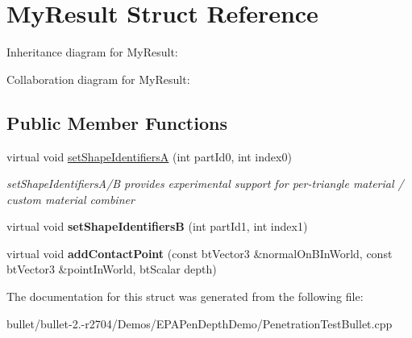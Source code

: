 \hypertarget{struct_my_result}{\section{My\+Result Struct Reference}
\label{struct_my_result}
}


Inheritance diagram for My\+Result\+:


Collaboration diagram for My\+Result\+:
\subsection*{Public Member Functions}
\begin{DoxyCompactItemize}
\item 
\hypertarget{struct_my_result_a2f12c46d079561c3f0c3015d3bc7e298}{virtual void \hyperlink{struct_my_result_a2f12c46d079561c3f0c3015d3bc7e298}{set\+Shape\+Identifiers\+A} (int part\+Id0, int index0)}\label{struct_my_result_a2f12c46d079561c3f0c3015d3bc7e298}

\begin{DoxyCompactList}\small\item\em set\+Shape\+Identifiers\+A/\+B provides experimental support for per-\/triangle material / custom material combiner \end{DoxyCompactList}\item 
\hypertarget{struct_my_result_a21dcb134b75557d26e438585c2888112}{virtual void {\bfseries set\+Shape\+Identifiers\+B} (int part\+Id1, int index1)}\label{struct_my_result_a21dcb134b75557d26e438585c2888112}

\item 
\hypertarget{struct_my_result_a642ea94371e02873b68f9f57f4ea1b33}{virtual void {\bfseries add\+Contact\+Point} (const bt\+Vector3 \&normal\+On\+B\+In\+World, const bt\+Vector3 \&point\+In\+World, bt\+Scalar depth)}\label{struct_my_result_a642ea94371e02873b68f9f57f4ea1b33}

\end{DoxyCompactItemize}


The documentation for this struct was generated from the following file\+:\begin{DoxyCompactItemize}
\item 
bullet/bullet-\/2.-\/r2704/\+Demos/\+E\+P\+A\+Pen\+Depth\+Demo/Penetration\+Test\+Bullet.\+cpp\end{DoxyCompactItemize}
